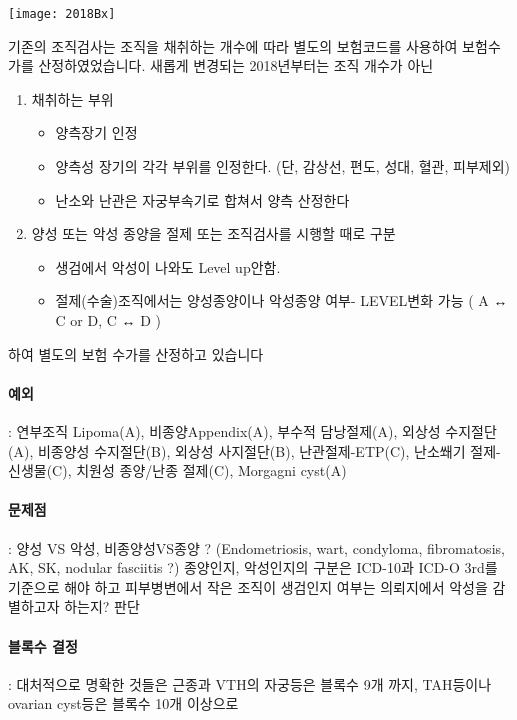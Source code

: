 \begin{center}
\texttt{[image: 2018Bx]}
\end{center}
\begin{mdframed}[linecolor=cyan,middlelinewidth=2]
기존의 조직검사는 조직을 채취하는 개수에 따라 별도의 보험코드를 사용하여 보험수가를 산정하였었습니다. 새롭게 변경되는 2018년부터는 조직 개수가 아닌
\begin{enumerate}[1)]\tightlist
\item 채취하는 부위
	\begin{itemize}\tightlist
	\item 양측장기 인정
	\item 양측성 장기의 각각 부위를 인정한다. (단, 감상선, 편도, 성대, 혈관, 피부제외)
	\item 난소와 난관은 자궁부속기로 합쳐서 양측 산정한다
	\end{itemize}
\item 양성 또는 악성 종양을 절제 또는 조직검사를 시행할 때로 구분
	\begin{itemize}\tightlist
	\item 생검에서 악성이 나와도 Level up안함.
	\item 절제(수술)조직에서는 양성종양이나 악성종양 여부- LEVEL변화 가능 ( A ↔ C or D, C ↔ D )
	\end{itemize}
\end{enumerate}
하여 별도의 보험 수가를 산정하고 있습니다
\paragraph{예외} : 연부조직 Lipoma(A), 비종양Appendix(A), 부수적 담낭절제(A), 외상성 수지절단(A), 비종양성 수지절단(B), 외상성 사지절단(B), 난관절제-ETP(C), 난소쐐기 절제- 신생물(C), 치원성 종양/난종 절제(C),  Morgagni cyst(A)\par
\paragraph{문제점} : 양성 VS 악성, 비종양성VS종양 ? (Endometriosis, wart, condyloma, fibromatosis, AK, SK, nodular fasciitis ?) 종양인지, 악성인지의 구분은 ICD-10과 ICD-O 3rd를 기준으로 해야 하고 피부병변에서 작은 조직이 생검인지 여부는 의뢰지에서 악성을 감별하고자 하는지? 판단\par
\paragraph{블록수 결정} : 대처적으로 명확한 것들은 근종과 VTH의 자궁등은 블록수 9개 까지, TAH등이나 ovarian cyst등은 블록수 10개 이상으로  
\end{mdframed}
